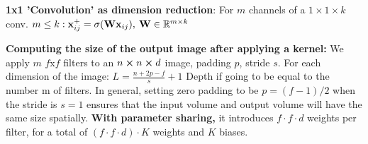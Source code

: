     \textbf{1x1 'Convolution' as dimension reduction}: 
    For $m$ channels of a $1\times1\times k$ conv. $m\leq k:\mathbf x^+_{ij}=\sigma(\mathbf W\mathbf x_{ij}),\>\mathbf W\in\mathbb R^{m\times k}$ 
    
    \textbf{Computing the size of the output image after applying a kernel:} We apply $m$ $f$x$f$ filters to an $n \cross n \cross d$ image, padding $p$, stride $s$. For each dimension of the image: $L=\frac{n+2p-f}{s}+1$ Depth if going to be equal to the number m of filters.
    In general, setting zero padding to be $p=(f-1)/2$ when the stride is $s=1$ ensures that the input volume and output volume will have the same size spatially.
   \textbf{ With parameter sharing,} it introduces $f \cdot f \cdot d $ weights per filter, for a total of $(f\cdot f\cdot d)\cdot K$ weights and $K$ biases.
